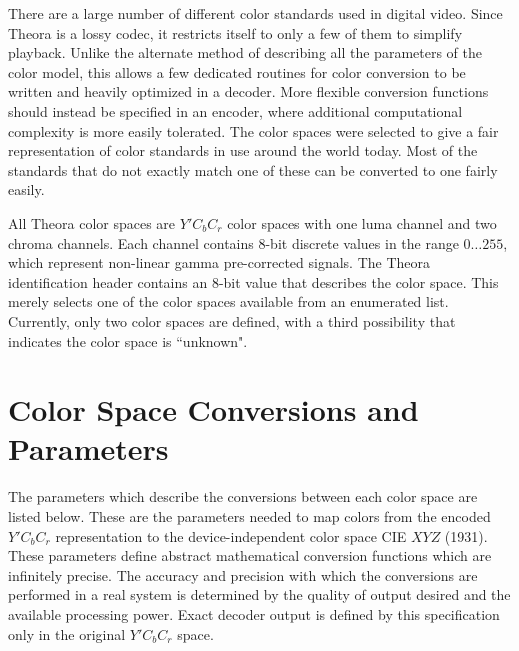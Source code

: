 \documentclass[11pt,letterpaper]{book}
\numberwithin{equation}{chapter}
\numberwithin{figure}{chapter}
\numberwithin{table}{chapter}
\begin{document}
There are a large number of different color standards used in digital video.
Since Theora is a lossy codec, it restricts itself to only a few of them to
 simplify playback.
Unlike the alternate method of describing all the parameters of the color
 model, this allows a few dedicated routines for color conversion to be written
 and heavily optimized in a decoder.
More flexible conversion functions should instead be specified in an encoder,
 where additional computational complexity is more easily tolerated.
The color spaces were selected to give a fair representation of color standards
 in use around the world today.
Most of the standards that do not exactly match one of these can be converted
 to one fairly easily.

All Theora color spaces are $Y'C_bC_r$ color spaces with one luma channel and
 two chroma channels.
Each channel contains 8-bit discrete values in the range $0\ldots255$, which
 represent non-linear gamma pre-corrected signals.
The Theora identification header contains an 8-bit value that describes the
 color space.
This merely selects one of the color spaces available from an enumerated list.
Currently, only two color spaces are defined, with a third possibility that
 indicates the color space is ``unknown".

\section{Color Space Conversions and Parameters}
\label{sec:color-xforms}

The parameters which describe the conversions between each color space are
 listed below.
These are the parameters needed to map colors from the encoded $Y'C_bC_r$
 representation to the device-independent color space CIE $XYZ$ (1931).
These parameters define abstract mathematical conversion functions which are
 infinitely precise.
The accuracy and precision with which the conversions are performed in a real
 system is determined by the quality of output desired and the available
 processing power.
Exact decoder output is defined by this specification only in the original
 $Y'C_bC_r$ space.
\end{document}
